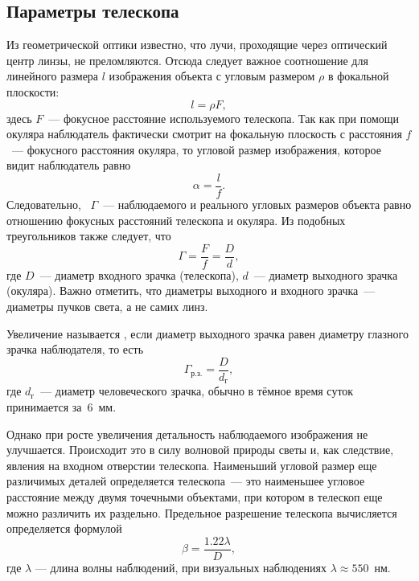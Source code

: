 \subsection{Параметры телескопа}
Из геометрической оптики известно, что лучи, проходящие через оптический центр линзы, не преломляются. Отсюда следует важное соотношение для линейного размера $l$ изображения объекта с угловым размером $\rho$ в фокальной плоскости:
\begin{equation}
	l = \rho F,
\end{equation}
здесь $F$~--- фокусное расстояние используемого телескопа.
Так как при помощи окуляра наблюдатель фактически смотрит на фокальную плоскость с расстояния $f$~--- фокусного расстояния окуляра, то угловой размер изображения, которое видит наблюдатель равно
\begin{equation}
	\alpha = \frac{l}{f}.
	\label{eq:zoom2}
\end{equation} 
Следовательно, ~$\Gamma$~--- наблюдаемого и реального угловых размеров объекта равно отношению фокусных расстояний телескопа и окуляра. Из подобных треугольников также следует, что
\begin{equation}
	\Gamma =\frac{F}{f} = \frac{D}{d},
	\label{eq:zoom1}
\end{equation}
где $D$~--- диаметр входного зрачка (телескопа), $d$~--- диаметр выходного зрачка (окуляра). Важно отметить, что диаметры выходного и входного зрачка~--- диаметры пучков света, а не самих линз.

Увеличение называется , если диаметр выходного зрачка равен диаметру глазного зрачка наблюдателя, то есть
\begin{equation}
\Gamma_\text{р.з.} = \frac{D}{d_\text{г}},
\end{equation}
где $d_\text{г}$~--- диаметр человеческого зрачка, обычно в тёмное время суток принимается за~6~мм.

Однако при росте увеличения детальность наблюдаемого изображения не улучшается. Происходит это в силу волновой природы светы и, как следствие, явления  на входном отверстии телескопа. Наименьший угловой размер еще различимых деталей определяется  телескопа~--- это наименьшее угловое расстояние между двумя точечными объектами, при котором в телескоп еще можно различить их раздельно. Предельное разрешение телескопа вычисляется определяется формулой
\begin{equation}
\beta = \frac{1.22\lambda}{D},
\end{equation}
где $\lambda$ --- длина волны наблюдений, при визуальных наблюдениях $\lambda \approx 550$~нм.

